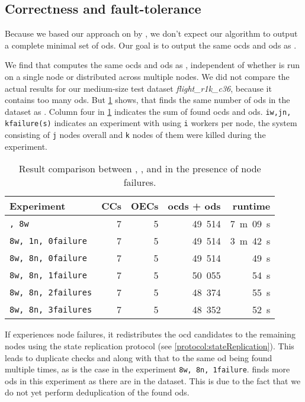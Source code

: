 \subsection{Correctness and fault-tolerance}\label{sec:evaluation:correctness}

  Because we based our approach on \ocddiscover{} by \citeauthor{consonni}, we don't expect our algorithm to output a complete minimal set of \glspl{od}.
  Our goal is to output the same \glspl{ocd} and \glspl{od} as \ocddiscover{}.

  We find that \dodo{} computes the same \glspl{ocd} and \glspl{od} as \ocddiscover{}, independent of whether \dodo{} is run on a single node or distributed across multiple nodes.
  We did not compare the actual results for our medium-size test dataset \textit{flight\_r1k\_c36}, because it contains too many \glspl{od}.
  But \cref{tab:results} shows, that \dodo{} finds the same number of \glspl{od} in the dataset as \ocddiscover{}.
  Column four in \cref{tab:results} indicates the sum of found \glspl{ocd} and \glspl{od}.
  \texttt{iw,jn, kfailure(s)} indicates an experiment with \dodo{} using \texttt{i} workers per node, the system consisting of \texttt{j} nodes overall and \texttt{k} nodes of them were killed during the experiment.

  \begin{table}
    \centering
    \begin{tabular}{lrrrr}
      \toprule
      \textbf{Experiment} & \textbf{CCs} & \textbf{OECs} & \textbf{\glspl{ocd} + \glspl{od}} & \textbf{runtime} \\
      \midrule
      \texttt{\ocddiscover{}, 8w} & 7 & 5 & 49~514 & 7~m~09~s \\
      \texttt{8w, 1n, 0failure} & 7 & 5 & 49~514 & 3~m~42~s \\
      \texttt{8w, 8n, 0failure} & 7 & 5 & 49~514 & 49~s \\
      \texttt{8w, 8n, 1failure} & 7 & 5 & 50~055 & 54~s \\
      \texttt{8w, 8n, 2failures} & 7 & 5 & 48~374 & 55~s \\
      \texttt{8w, 8n, 3failures} & 7 & 5 & 48~352 & 52~s \\
      \bottomrule
    \end{tabular}
    \caption{Result comparison between \ocddiscover{}, \dodo{}, and \dodo{} in the presence of node failures.}
    \label{tab:results}
  \end{table}

  If \dodo{} experiences node failures, it redistributes the \gls{ocd} candidates to the remaining nodes using the state replication protocol (see \cref{protocol:stateReplication}).
  This leads to duplicate checks and along with that to the same \gls{od} being found multiple times, as is the case in the experiment \texttt{8w, 8n, 1failure}.
  \dodo{} finds more \glspl{od} in this experiment as there are in the dataset.
  This is due to the fact that we do not yet perform deduplication of the found \glspl{od}.

